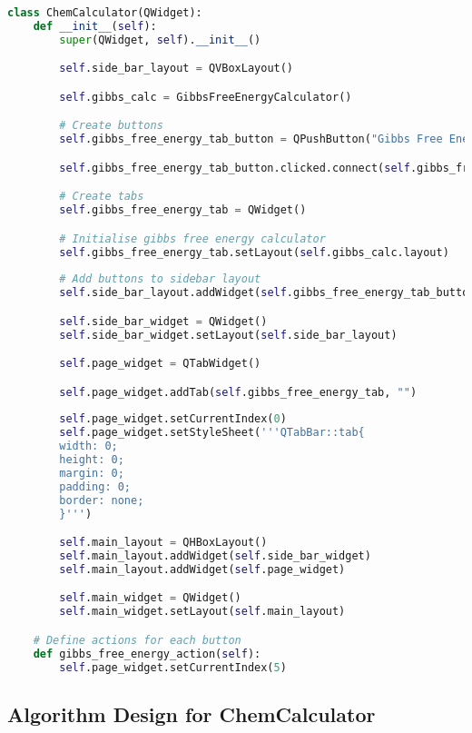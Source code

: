 \documentclass[a4paper,12pt]{article}
\begin{document}
\begin{lstlisting}[language=Python, caption=Example of ChemCalculator implementation, label={lst:chemcalculator_example}]
class ChemCalculator(QWidget):
    def __init__(self):
        super(QWidget, self).__init__()

        self.side_bar_layout = QVBoxLayout()

        self.gibbs_calc = GibbsFreeEnergyCalculator()

        # Create buttons
        self.gibbs_free_energy_tab_button = QPushButton("Gibbs Free Energy Calculator")

        self.gibbs_free_energy_tab_button.clicked.connect(self.gibbs_free_energy_action)

        # Create tabs
        self.gibbs_free_energy_tab = QWidget()

        # Initialise gibbs free energy calculator
        self.gibbs_free_energy_tab.setLayout(self.gibbs_calc.layout)
        
        # Add buttons to sidebar layout
        self.side_bar_layout.addWidget(self.gibbs_free_energy_tab_button)

        self.side_bar_widget = QWidget()
        self.side_bar_widget.setLayout(self.side_bar_layout)

        self.page_widget = QTabWidget()

        self.page_widget.addTab(self.gibbs_free_energy_tab, "")
        
        self.page_widget.setCurrentIndex(0)
        self.page_widget.setStyleSheet('''QTabBar::tab{
        width: 0; 
        height: 0; 
        margin: 0; 
        padding: 0; 
        border: none;
        }''')

        self.main_layout = QHBoxLayout()
        self.main_layout.addWidget(self.side_bar_widget)
        self.main_layout.addWidget(self.page_widget)

        self.main_widget = QWidget()
        self.main_widget.setLayout(self.main_layout)

    # Define actions for each button
    def gibbs_free_energy_action(self):
        self.page_widget.setCurrentIndex(5)

\end{lstlisting}

\subsection{Algorithm Design for ChemCalculator}
\end{document}
